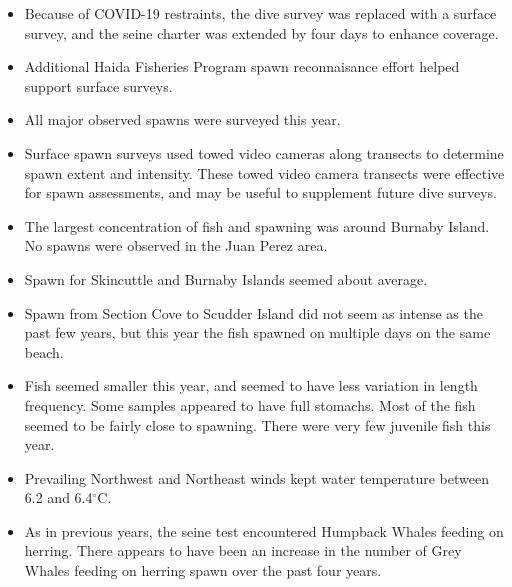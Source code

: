 \begin{itemize}

\item Because of COVID-19 restraints, the dive survey was replaced with a surface survey, and the seine charter was extended by four days to enhance coverage.

\item Additional Haida Fisheries Program spawn reconnaisance effort helped support surface surveys.

\item All major observed spawns were surveyed this year.

\item Surface spawn surveys used towed video cameras along transects to determine spawn extent and intensity.
These towed video camera transects were effective for spawn assessments, and may be useful to supplement future dive surveys.

\item The largest concentration of fish and spawning was around Burnaby Island.
No spawns were observed in the Juan Perez area.

\item Spawn for Skincuttle and Burnaby Islands seemed about average.

\item Spawn from Section Cove to Scudder Island did not seem as intense as the past few years,
but this year the fish spawned on multiple days on the same beach.

\item Fish seemed smaller this year, and seemed to have less variation in length frequency.
Some samples appeared to have full stomachs.
Most of the fish seemed to be fairly close to spawning.
There were very few juvenile fish this year.

\item Prevailing Northwest and Northeast winds kept water temperature between 6.2 and 6.4$^\circ\text{C}$.

\item As in previous years, the seine test encountered Humpback Whales feeding on herring.
There appears to have been an increase in the number of Grey Whales feeding on herring spawn over the past four years.

\end{itemize}
